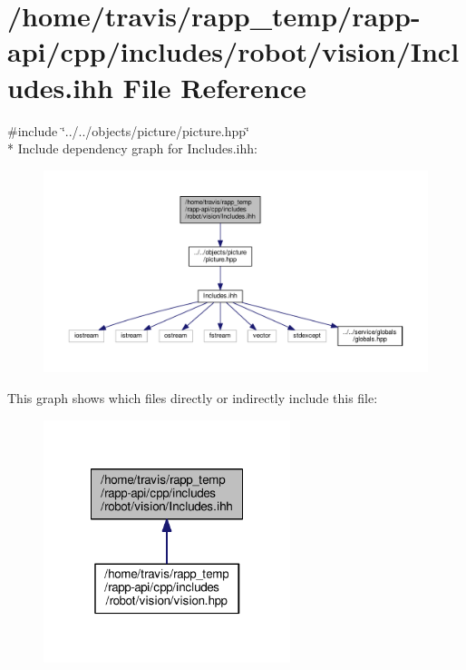 \hypertarget{robot_2vision_2Includes_8ihh}{\section{/home/travis/rapp\-\_\-temp/rapp-\/api/cpp/includes/robot/vision/\-Includes.ihh File Reference}
\label{robot_2vision_2Includes_8ihh}
}
{\ttfamily \#include \char`\"{}../../objects/picture/picture.\-hpp\char`\"{}}\\*
Include dependency graph for Includes.\-ihh\-:
\nopagebreak
\begin{figure}[H]
\begin{center}
\leavevmode
\includegraphics[width=350pt]{robot_2vision_2Includes_8ihh__incl}
\end{center}
\end{figure}
This graph shows which files directly or indirectly include this file\-:
\nopagebreak
\begin{figure}[H]
\begin{center}
\leavevmode
\includegraphics[width=204pt]{robot_2vision_2Includes_8ihh__dep__incl}
\end{center}
\end{figure}
